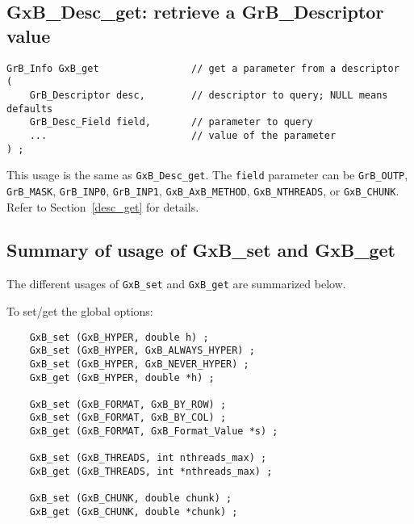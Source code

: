 \documentclass[12pt]{article}
\begin{document}
\subsection{{\sf GxB\_Desc\_get:} retrieve a {\sf GrB\_Descriptor} value}

\begin{mdframed}[userdefinedwidth=6in]
{\footnotesize
\begin{verbatim}
GrB_Info GxB_get                // get a parameter from a descriptor
(
    GrB_Descriptor desc,        // descriptor to query; NULL means defaults
    GrB_Desc_Field field,       // parameter to query
    ...                         // value of the parameter
) ;
\end{verbatim} } \end{mdframed}

This usage is the same as \verb'GxB_Desc_get'.  The \verb'field' parameter can
be \verb'GrB_OUTP', \verb'GrB_MASK', \verb'GrB_INP0', \verb'GrB_INP1',
\verb'GxB_AxB_METHOD',
\verb'GxB_NTHREADS', or \verb'GxB_CHUNK'.
Refer to Section~\ref{desc_get} for details.

\newpage
\subsection{Summary of usage of {\sf GxB\_set} and {\sf GxB\_get}}

The different usages of \verb'GxB_set' and \verb'GxB_get' are summarized below.

\noindent
To set/get the global options:

    {\footnotesize
    \begin{verbatim}
    GxB_set (GxB_HYPER, double h) ;
    GxB_set (GxB_HYPER, GxB_ALWAYS_HYPER) ;
    GxB_set (GxB_HYPER, GxB_NEVER_HYPER) ;
    GxB_get (GxB_HYPER, double *h) ;

    GxB_set (GxB_FORMAT, GxB_BY_ROW) ;
    GxB_set (GxB_FORMAT, GxB_BY_COL) ;
    GxB_get (GxB_FORMAT, GxB_Format_Value *s) ;

    GxB_set (GxB_THREADS, int nthreads_max) ;
    GxB_get (GxB_THREADS, int *nthreads_max) ;

    GxB_set (GxB_CHUNK, double chunk) ;
    GxB_get (GxB_CHUNK, double *chunk) ; \end{verbatim} }
\end{document}
